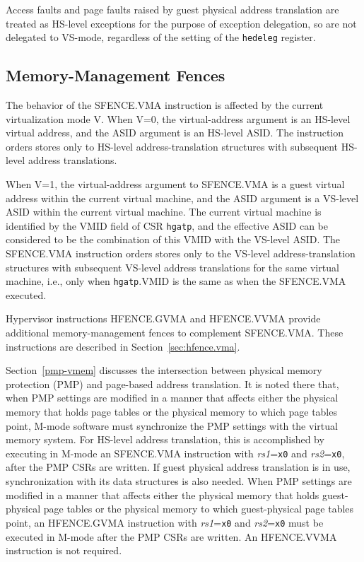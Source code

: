 Access faults and page faults raised by guest physical address translation are
treated as HS-level exceptions for the purpose of exception delegation, so are
not delegated to VS-mode, regardless of the setting of the {\tt hedeleg}
register.

\subsection{Memory-Management Fences}

The behavior of the SFENCE.VMA instruction is affected by the current
virtualization mode V.  When V=0, the virtual-address argument is an HS-level
virtual address, and the ASID argument is an HS-level ASID.
The instruction orders stores only to HS-level address-translation structures
with subsequent HS-level address translations.

When V=1, the virtual-address argument to SFENCE.VMA is a guest virtual
address within the current virtual machine, and the ASID argument is a VS-level
ASID within the current virtual machine.
The current virtual machine is identified by the VMID field of CSR {\tt hgatp},
and the effective ASID can be considered to be the combination of this VMID
with the VS-level ASID.
The SFENCE.VMA instruction orders stores only to the VS-level
address-translation structures with subsequent VS-level address translations
for the same virtual machine, i.e., only when {\tt hgatp}.VMID is the same as
when the SFENCE.VMA executed.

Hypervisor instructions HFENCE.GVMA and HFENCE.VVMA provide additional
memory-management fences to complement SFENCE.VMA.
These instructions are described in Section~\ref{sec:hfence.vma}.

Section~\ref{pmp-vmem} discusses the intersection between physical memory
protection (PMP) and page-based address translation.
It is noted there that, when PMP settings are modified in a manner that affects
either the physical memory that holds page tables or the physical memory to
which page tables point, M-mode software must synchronize the PMP settings with
the virtual memory system.
For HS-level address translation, this is accomplished by executing in M-mode
an SFENCE.VMA instruction with {\em rs1}={\tt x0} and {\em rs2}={\tt x0}, after
the PMP CSRs are written.
If guest physical address translation is in use, synchronization with its data
structures is also needed.
When PMP settings are modified in a manner that affects either the physical
memory that holds guest-physical page tables or the physical memory to which
guest-physical page tables point, an HFENCE.GVMA instruction with
{\em rs1}={\tt x0} and {\em rs2}={\tt x0} must be executed in M-mode after the
PMP CSRs are written.
An HFENCE.VVMA instruction is not required.

